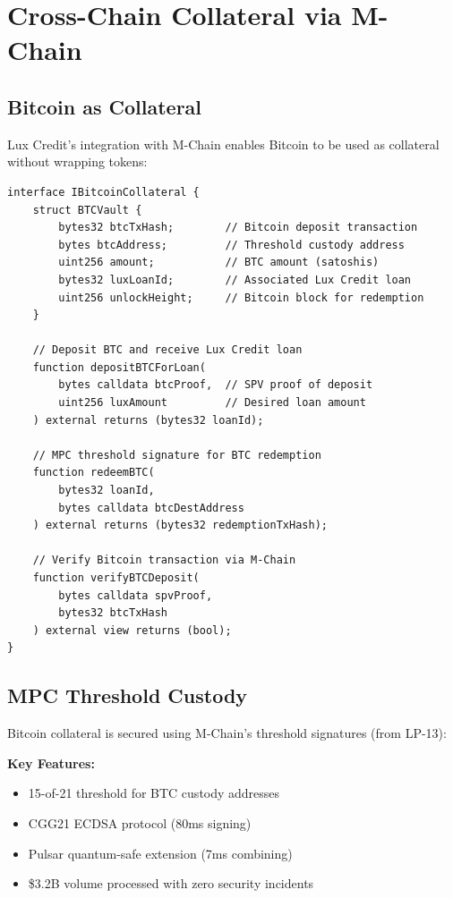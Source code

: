 \section{Cross-Chain Collateral via M-Chain}


\subsection{Bitcoin as Collateral}

Lux Credit's integration with M-Chain enables Bitcoin to be used as collateral without wrapping tokens:

\begin{lstlisting}[language=Solidity, basicstyle=\small\ttfamily]
interface IBitcoinCollateral {
    struct BTCVault {
        bytes32 btcTxHash;        // Bitcoin deposit transaction
        bytes btcAddress;         // Threshold custody address
        uint256 amount;           // BTC amount (satoshis)
        bytes32 luxLoanId;        // Associated Lux Credit loan
        uint256 unlockHeight;     // Bitcoin block for redemption
    }
    
    // Deposit BTC and receive Lux Credit loan
    function depositBTCForLoan(
        bytes calldata btcProof,  // SPV proof of deposit
        uint256 luxAmount         // Desired loan amount
    ) external returns (bytes32 loanId);
    
    // MPC threshold signature for BTC redemption
    function redeemBTC(
        bytes32 loanId,
        bytes calldata btcDestAddress
    ) external returns (bytes32 redemptionTxHash);
    
    // Verify Bitcoin transaction via M-Chain
    function verifyBTCDeposit(
        bytes calldata spvProof,
        bytes32 btcTxHash
    ) external view returns (bool);
}
\end{lstlisting}

\subsection{MPC Threshold Custody}

Bitcoin collateral is secured using M-Chain's threshold signatures (from LP-13):

\textbf{Key Features:}
\begin{itemize}
\item 15-of-21 threshold for BTC custody addresses
\item CGG21 ECDSA protocol (80ms signing)
\item Pulsar quantum-safe extension (7ms combining)
\item \$3.2B volume processed with zero security incidents
\end{itemize}

